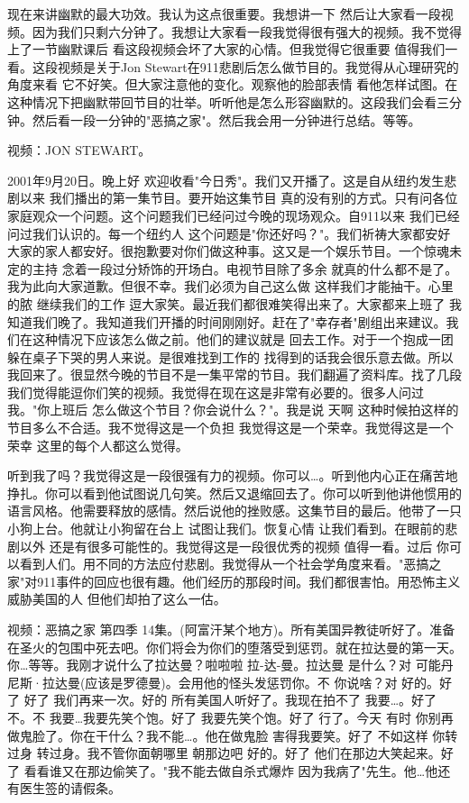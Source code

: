 现在来讲幽默的最大功效。我认为这点很重要。我想讲一下 然后让大家看一段视频。因为我们只剩六分钟了。我想让大家看一段我觉得很有强大的视频。我不觉得上了一节幽默课后 看这段视频会坏了大家的心情。但我觉得它很重要 值得我们一看。这段视频是关于Jon Stewart在911悲剧后怎么做节目的。我觉得从心理研究的角度来看 它不好笑。但大家注意他的变化。观察他的脸部表情 看他怎样试图。在这种情况下把幽默带回节目的壮举。听听他是怎么形容幽默的。这段我们会看三分钟。然后看一段一分钟的"恶搞之家"。然后我会用一分钟进行总结。等等。 

视频：JON STEWART。 

2001年9月20日。晚上好 欢迎收看"今日秀"。我们又开播了。这是自从纽约发生悲剧以来 我们播出的第一集节目。要开始这集节目 真的没有别的方式。只有问各位家庭观众一个问题。这个问题我们已经问过今晚的现场观众。自911以来 我们已经问过我们认识的。每一个纽约人 这个问题是"你还好吗？"。我们祈祷大家都安好 大家的家人都安好。很抱歉要对你们做这种事。这又是一个娱乐节目。一个惊魂未定的主持 念着一段过分矫饰的开场白。电视节目除了多余 就真的什么都不是了。我为此向大家道歉。但很不幸。我们必须为自己这么做 这样我们才能抽干。心里的脓 继续我们的工作 逗大家笑。最近我们都很难笑得出来了。大家都来上班了 我知道我们晚了。我知道我们开播的时间刚刚好。赶在了"幸存者"剧组出来建议。我们在这种情况下应该怎么做之前。他们的建议就是 回去工作。对于一个抱成一团 躲在桌子下哭的男人来说。是很难找到工作的 找得到的话我会很乐意去做。所以我回来了。很显然今晚的节目不是一集平常的节目。我们翻遍了资料库。找了几段我们觉得能逗你们笑的视频。我觉得在现在这是非常有必要的。很多人问过我。"你上班后 怎么做这个节目？你会说什么？"。我是说 天啊 这种时候拍这样的节目多么不合适。我不觉得这是一个负担 我觉得这是一个荣幸。我觉得这是一个荣幸 这里的每个人都这么觉得。 

听到我了吗？我觉得这是一段很强有力的视频。你可以…。听到他内心正在痛苦地挣扎。你可以看到他试图说几句笑。然后又退缩回去了。你可以听到他讲他惯用的语言风格。他需要释放的感情。然后说他的挫败感。这集节目的最后。他带了一只小狗上台。他就让小狗留在台上 试图让我们。恢复心情 让我们看到。在眼前的悲剧以外 还是有很多可能性的。我觉得这是一段很优秀的视频 值得一看。过后 你可以看到人们。用不同的方法应付悲剧。我觉得从一个社会学角度来看。"恶搞之家"对911事件的回应也很有趣。他们经历的那段时间。我们都很害怕。用恐怖主义威胁美国的人 但他们却拍了这么一估。 

视频：恶搞之家 第四季 14集。(阿富汗某个地方)。所有美国异教徒听好了。准备在圣火的包围中死去吧。你们将会为你们的堕落受到惩罚。就在拉达曼的第一天。你…等等。我刚才说什么了拉达曼？啦啦啦 拉-达-曼。拉达曼 是什么？对 可能丹尼斯·拉达曼(应该是罗德曼)。会用他的怪头发惩罚你。不 你说啥？对 好的。好了 好了 我们再来一次。好的 所有美国人听好了。我现在拍不了 我要…。好了 不。不 我要…我要先笑个饱。好了 我要先笑个饱。好了 行了。今天 有时 你别再做鬼脸了。你在干什么？我不能…。他在做鬼脸 害得我要笑。好了 不如这样 你转过身 转过身。我不管你面朝哪里 朝那边吧 好的。好了 他们在那边大笑起来。好了 看看谁又在那边偷笑了。"我不能去做自杀式爆炸 因为我病了"先生。他…他还有医生签的请假条。 


